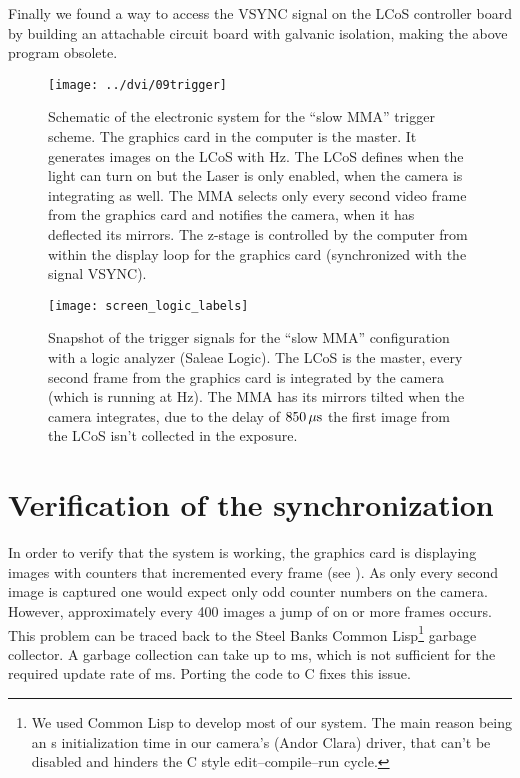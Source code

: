 Finally we found a way to access the \textsf{VSYNC} signal on the LCoS
controller board by building an attachable circuit board with galvanic
isolation, making the above program obsolete.


\begin{figure}[!hbt]
  \centering
  \texttt{[image: ../dvi/09trigger]}
  \caption{Schematic of the electronic system for the ``slow MMA''
    trigger scheme. The graphics card in the computer is the
    master. It generates images on the LCoS with \unit[60]{Hz}. The
    LCoS defines when the light can turn on but the Laser is only
    enabled, when the camera is integrating as well. The MMA selects
    only every second video frame from the graphics card and notifies
    the camera, when it has deflected its mirrors. The z-stage is controlled by the computer from within the display loop for the graphics card (synchronized with the signal \textsf{VSYNC}).  }
  \label{fig:09trigger}
\end{figure}



\begin{figure}[!hbt]
  \centering
  \texttt{[image: screen\_logic\_labels]}
  \caption{Snapshot of the trigger signals for the ``slow MMA''
    configuration with a logic analyzer (Saleae Logic). The LCoS is
    the master, every second frame from the graphics card is
    integrated by the camera (which is running at \unit[30]{Hz}). The
    MMA has its mirrors tilted when the camera integrates, due to the
    delay of $\unit[850]{\mu s}$ the first image from the LCoS isn't
    collected in the exposure.}
  \label{fig:screen_logic_labels}
\end{figure}

\section{Verification of the synchronization}
In order to verify that the system is working, the graphics card is
displaying images with counters that incremented every frame (see
). As only every second image is
captured one would expect only odd counter numbers on the
camera. However, approximately every 400 images a jump of on or more
frames occurs. This problem can be traced back to the Steel Banks
Common Lisp\footnote{We used Common Lisp to develop most of our
  system. The main reason being an \unit[8]{s} initialization time in
  our camera's (Andor Clara) driver, that can't be disabled and
  hinders the C style edit--compile--run cycle.} garbage collector. A
garbage collection can take up to \unit[80]{ms}, which is not
sufficient for the required update rate of \unit[16]{ms}. Porting the
code to C fixes this issue.

